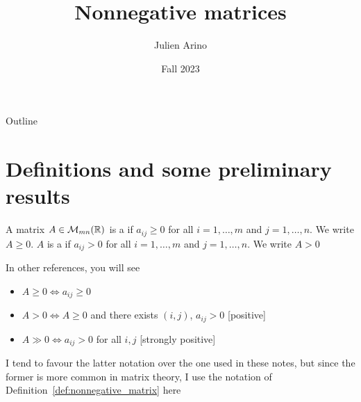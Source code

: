 \documentclass[aspectratio=169]{beamer}
\title{Nonnegative matrices}
\author{Julien Arino}
\date{Fall 2023}
\begin{document}
\begin{frame}
	\titlepage
\end{frame}
\addtocounter{page}{-1}
  
  
\begin{frame}{Outline}
	  \tableofcontents[hideallsubsections]
\end{frame}
\addtocounter{page}{-1}


\section{Definitions and some preliminary results}

\begin{frame}
\begin{definition}
  \label{def:nonnegative_matrix}
A matrix $A\in \mathcal{M}_{mn}(\mathbb{R})$ is a  if $a_{ij}\geq 0$ for all $i=1,\ldots,m$ and $j=1,\ldots,n$. We write $A\geq 0$. $A$ is a  if $a_{ij}>0$ for all $i=1,\ldots,m$ and $j=1,\ldots,n$. We write $A>0$
\end{definition}
\vfill
\begin{remark}
In other references, you will see
\begin{itemize}
    \item $A\geq 0 \iff a_{ij}\geq 0$
    \item $A>0 \iff A\geq 0$ and there exists $(i,j)$, $a_{ij}>0$ 
    \hfill [positive]
    \item $A\gg 0 \iff a_{ij}>0$ for all $i,j$ \hfill [strongly positive]
\end{itemize}
I tend to favour the latter notation over the one used in these notes, but since the former is more common in matrix theory, I use the notation of Definition~\ref{def:nonnegative_matrix} here
\end{remark}
\end{frame}
\end{document}
